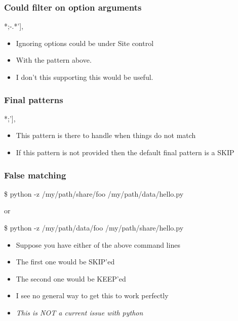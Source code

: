 \documentclass{beamer}
\begin{document}
\begin{frame}[fragile]
    \frametitle{Could filter on option arguments}
 {\tiny
    \begin{semiverbatim}
  ['CONTINUE, r'.*\\/python[0-9][^/;][^/;]*;-.*'],
    \end{semiverbatim}
}
  \begin{itemize}
    \item Ignoring options could be under Site control
    \item With the pattern above.
    \item I don't this supporting this would be useful.
  \end{itemize}
\end{frame}

\begin{frame}[fragile]
    \frametitle{Final patterns}
 {\tiny
    \begin{semiverbatim}
  ['PKGS', r'.*\\/python[0-9][^/;][^/;]*;'],
    \end{semiverbatim}
}
  \begin{itemize}
    \item This pattern is there to handle when things do not match
    \item If this pattern is not provided then the default final
      pattern is a SKIP
  \end{itemize}
\end{frame}

\begin{frame}[fragile]
    \frametitle{False matching}
 {\tiny
    \begin{semiverbatim}
\$ python -z /my/path/share/foo /my/path/data/hello.py

or

\$ python -z /my/path/data/foo /my/path/share/hello.py

    \end{semiverbatim}
}
  \begin{itemize}
    \item Suppose you have either of the above command lines
    \item The first one would be SKIP'ed
    \item The second one would be KEEP'ed
    \item I see no general way to get this to work perfectly
    \item \emph{This is NOT a current issue with python}
  \end{itemize}

\end{frame}
\end{document}
